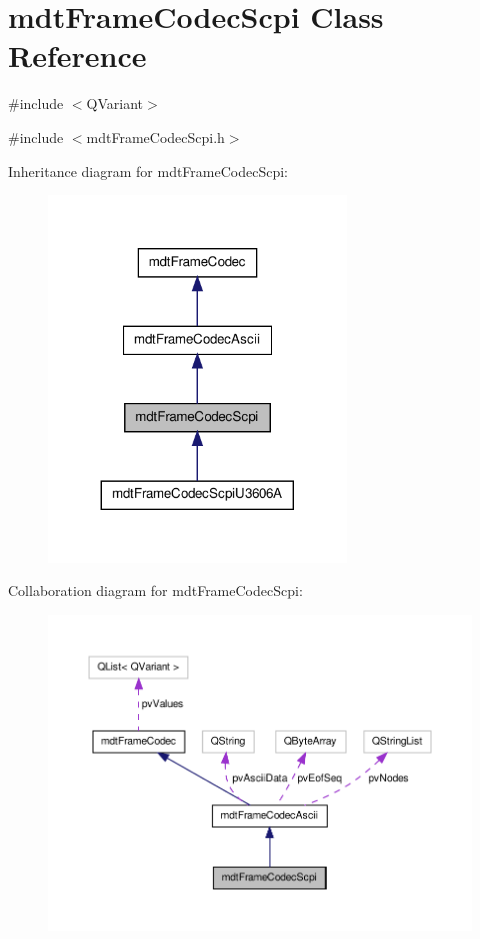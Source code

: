 \hypertarget{classmdt_frame_codec_scpi}{\section{mdt\-Frame\-Codec\-Scpi Class Reference}
\label{classmdt_frame_codec_scpi}
}


\#include $<$\-Q\-Variant$>$  




{\ttfamily \#include $<$mdt\-Frame\-Codec\-Scpi.\-h$>$}



Inheritance diagram for mdt\-Frame\-Codec\-Scpi\-:\nopagebreak
\begin{figure}[H]
\begin{center}
\leavevmode
\includegraphics[width=224pt]{classmdt_frame_codec_scpi__inherit__graph}
\end{center}
\end{figure}


Collaboration diagram for mdt\-Frame\-Codec\-Scpi\-:\nopagebreak
\begin{figure}[H]
\begin{center}
\leavevmode
\includegraphics[width=350pt]{classmdt_frame_codec_scpi__coll__graph}
\end{center}
\end{figure}
